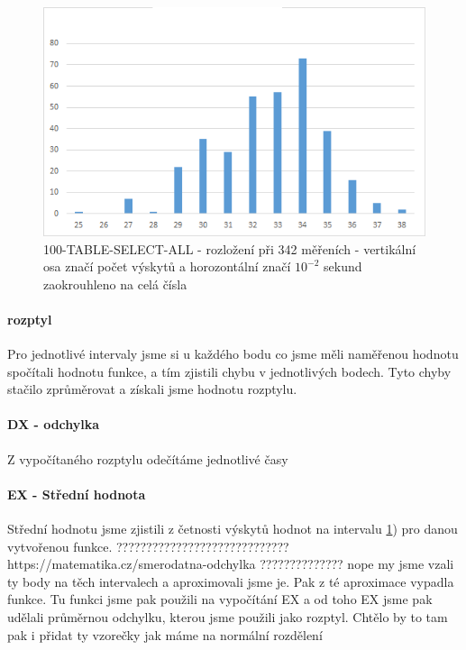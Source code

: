 \documentclass[a4paper, 11pt]{article}
\begin{document}
\begin{figure}[H]
\centering
\includegraphics[width=150mm, frame]{images/100-TABLE-SELECT-ALL-342.png}
\caption{100-TABLE-SELECT-ALL - rozložení při 342 měřeních - vertikální osa značí počet výskytů a horozontální značí $10^{-2}$ sekund zaokrouhleno na celá čísla}
\label{sec:obr3}
\end{figure}


\paragraph{rozptyl} Pro jednotlivé intervaly jsme si u každého bodu co jsme měli naměřenou hodnotu spočítali hodnotu funkce, a tím zjistili chybu v jednotlivých bodech. Tyto chyby stačilo zprůměrovat a získali jsme hodnotu rozptylu. 
\paragraph{DX - odchylka} Z vypočítaného rozptylu odečítáme jednotlivé časy 
\paragraph{EX - Střední hodnota} Střední hodnotu jsme zjistili z četnosti výskytů hodnot na intervalu \ref{sec:obr3}) pro danou vytvořenou funkce.
 ????????????????????????????? 
https://matematika.cz/smerodatna-odchylka
??????????????
nope my jsme vzali ty body na těch intervalech a aproximovali jsme je. Pak z té aproximace vypadla funkce. Tu funkci jsme pak použili na vypočítání EX a od toho EX jsme pak udělali průměrnou odchylku, kterou jsme použili jako rozptyl.
Chtělo by to tam pak i přidat ty vzorečky jak máme
na normální rozdělení
\end{document}
